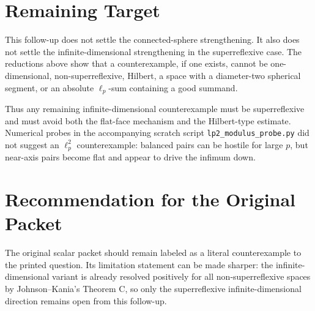 \documentclass[11pt]{article}
\begin{document}
\section*{Remaining Target}

This follow-up does not settle the connected-sphere strengthening.  It
also does not settle the infinite-dimensional strengthening in the
superreflexive case.  The reductions above show that a counterexample,
if one exists, cannot be one-dimensional, non-superreflexive, Hilbert, a
space with a diameter-two spherical segment, or an absolute
\(\ell_p\)-sum containing a good summand.

Thus any remaining infinite-dimensional counterexample must be
superreflexive and must avoid both the flat-face mechanism and the
Hilbert-type estimate.  Numerical probes in the accompanying scratch
script \texttt{lp2\_modulus\_probe.py} did not suggest an
\(\ell_p^2\) counterexample: balanced pairs can be hostile for large
\(p\), but near-axis pairs become flat and appear to drive the infimum
down.

\section*{Recommendation for the Original Packet}

The original scalar packet should remain labeled as a literal
counterexample to the printed question.  Its limitation statement can be
made sharper: the infinite-dimensional variant is already resolved
positively for all non-superreflexive spaces by Johnson--Kania's
Theorem C, so only the superreflexive infinite-dimensional direction
remains open from this follow-up.
\end{document}
